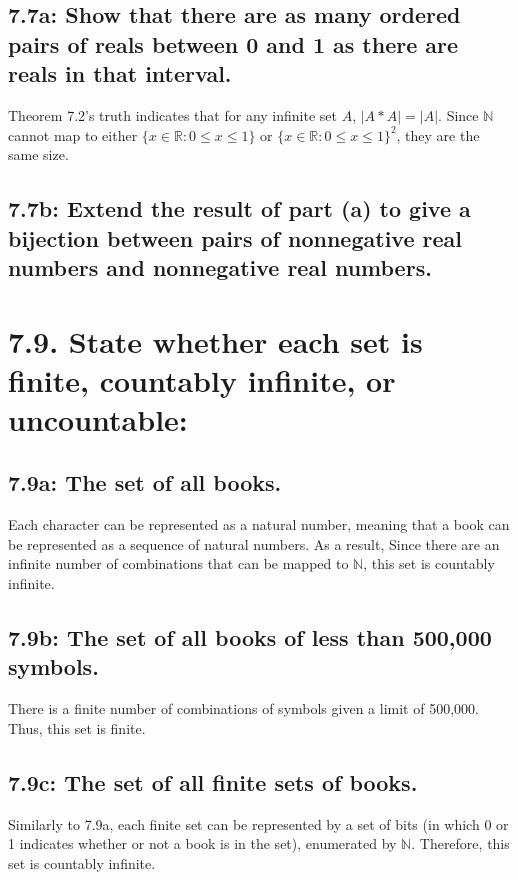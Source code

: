 \documentclass{article}
\begin{document}
\subsection*{7.7a: Show that there are as many ordered pairs of reals between 0 and 1 as there are reals in that interval.}
Theorem 7.2's truth indicates that for any infinite set $A$, $|A*A|=|A|$. Since $\mathbb{N}$ cannot map to either $\{x\in\mathbb{R}:0\leq x\leq1\}$ or $\{x\in\mathbb{R}:0\leq x\leq1\}^2$, they are the same size.
\subsection*{7.7b: Extend the result of part (a) to give a bijection between pairs of nonnegative real numbers and nonnegative real numbers.}
\section*{7.9. State whether each set is finite, countably infinite, or uncountable:}
\subsection*{7.9a: The set of all books.}
Each character can be represented as a natural number, meaning that a book can be represented as a sequence of natural numbers. As a result, Since there are an infinite number of combinations that can be mapped to $\mathbb{N}$, this set is countably infinite.
\subsection*{7.9b: The set of all books of less than 500,000 symbols.}
There is a finite number of combinations of symbols given a limit of 500,000. Thus, this set is finite.
\subsection*{7.9c: The set of all finite sets of books.}
Similarly to 7.9a, each finite set can be represented by a set of bits (in which 0 or 1 indicates whether or not a book is in the set), enumerated by $\mathbb{N}$. Therefore, this set is countably infinite.
\end{document}
